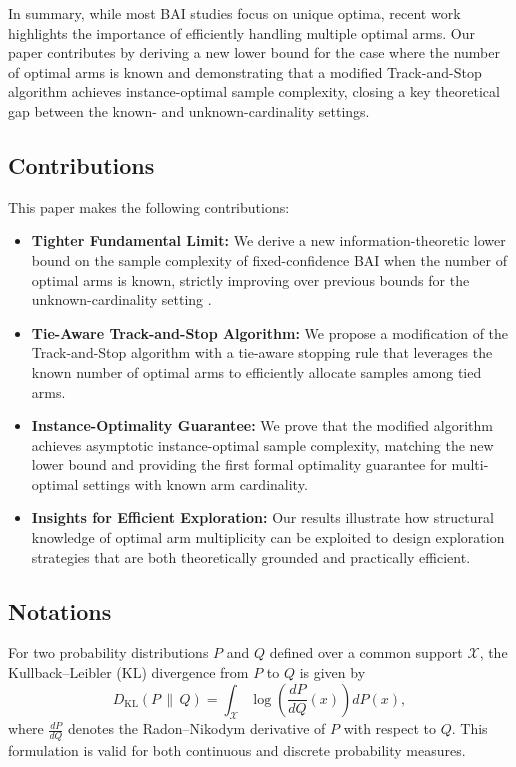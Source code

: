 \documentclass[final]{IEEEtran}
\begin{document}
In summary, while most BAI studies focus on unique optima, recent work highlights the importance of efficiently handling multiple optimal arms. Our paper contributes by deriving a new lower bound for the case where the number of optimal arms is known and demonstrating that a modified Track-and-Stop algorithm achieves instance-optimal sample complexity, closing a key theoretical gap between the known- and unknown-cardinality settings.
\subsection{Contributions}

This paper makes the following contributions:
\begin{itemize}
	\item \textbf{Tighter Fundamental Limit:} We derive a new information-theoretic lower bound on the sample complexity of fixed-confidence BAI when the number of optimal arms is known, strictly improving over previous bounds for the unknown-cardinality setting \cite{Degenne2019PureEW}.
       \item \textbf{Tie-Aware Track-and-Stop Algorithm:} We propose a modification of the Track-and-Stop algorithm with a tie-aware stopping rule that leverages the known number of optimal arms to efficiently allocate samples among tied arms.
	\item \textbf{Instance-Optimality Guarantee:} We prove that the modified algorithm achieves asymptotic instance-optimal sample complexity, matching the new lower bound and providing the first formal optimality guarantee for multi-optimal settings with known arm cardinality.
	\item \textbf{Insights for Efficient Exploration:} Our results illustrate how structural knowledge of optimal arm multiplicity can be exploited to design exploration strategies that are both theoretically grounded and practically efficient.
\end{itemize}
\subsection{Notations} 
For two probability distributions $P$ and $Q$ defined over a common support $\mathcal{X}$, the Kullback–Leibler (KL) divergence from $P$ to $Q$ is given by
\begin{equation}
D_{\mathrm{KL}}(P \,\|\, Q)
= \int_{\mathcal{X}} \log\!\left(\frac{dP}{dQ}(x)\right) dP(x),
\end{equation}
where $\frac{dP}{dQ}$ denotes the Radon–Nikodym derivative of $P$ with respect to $Q$. 
This formulation is valid for both continuous and discrete probability measures.
\end{document}
